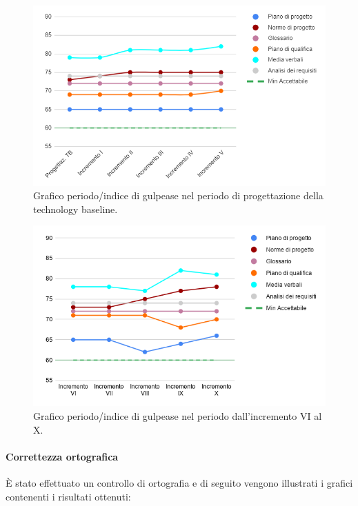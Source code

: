 \begin{figure}[H]
	\centering
	\includegraphics[width=0.8\linewidth]{./res/images/gulpease_2.png}
	\caption{Grafico periodo/indice di gulpease nel periodo di progettazione della technology baseline.}
	\label{fig:Grafico indice di gulpease periodo di progettazione della technology baseline.}
\end{figure}

\begin{figure}[H]
	\centering
	\includegraphics[width=0.8\linewidth]{./res/images/gulpease_3.png}
	\caption{Grafico periodo/indice di gulpease nel periodo dall'incremento VI al X.}
	\label{fig:Grafico indice di gulpease periodo dall'incremento VI al X.}
\end{figure}

\paragraph{Correttezza ortografica}
È stato effettuato un controllo di ortografia e di seguito vengono illustrati i grafici contenenti i risultati ottenuti:

